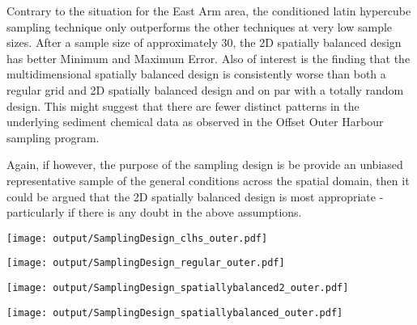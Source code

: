 \documentclass[a4paper]{article}
\let\origfigure=\figure
\let\endorigfigure=\endfigure
\renewenvironment{figure}[1][]{%
   \origfigure[H]
}{%
   \endorigfigure
}
\begin{document}
Contrary to the situation for the East Arm area, the conditioned latin
hypercube sampling technique only outperforms the other techniques at
very low sample sizes. After a sample size of approximately 30, the 2D
spatially balanced design has better Minimum and Maximum Error. Also of
interest is the finding that the multidimensional spatially balanced
design is consistently worse than both a regular grid and 2D spatially
balanced design and on par with a totally random design. This might
suggest that there are fewer distinct patterns in the underlying
sediment chemical data as observed in the Offset Outer Harbour sampling
program.

Again, if however, the purpose of the sampling design is be provide an
unbiased representative sample of the general conditions across the
spatial domain, then it could be argued that the 2D spatially balanced
design is most appropriate - particularly if there is any doubt in the
above assumptions.

\begin{figure}
\centering\scriptsize
\texttt{[image: output/SamplingDesign\_clhs\_outer.pdf]}
\caption{Sampling configurations associated with the lowest mean Error
for each sample size for cLHS for the Outer
Harbour\label{fig:SamplingDesign_clhs_outer}}
\end{figure}

\begin{figure}
\centering\scriptsize
\texttt{[image: output/SamplingDesign\_regular\_outer.pdf]}
\caption{Sampling configurations associated with the lowest mean Error
for each sample size for Regular grid sampling for the Outer
Harbour\label{fig:SamplingDesign_regular_outer}}
\end{figure}

\begin{figure}
\centering\scriptsize
\texttt{[image: output/SamplingDesign\_spatiallybalanced2\_outer.pdf]}
\caption{Sampling configurations associated with the lowest mean Error
for each sample size for nD Spatially balanced sampling for the Outer
Harbour\label{fig:SamplingDesign_spatiallybalanced2_outer}}
\end{figure}

\begin{figure}
\centering\scriptsize
\texttt{[image: output/SamplingDesign\_spatiallybalanced\_outer.pdf]}
\caption{Sampling configurations associated with the lowest mean Error
for each sample size for 2D Spatially balanced sampling for the Outer
Harbour\label{fig:SamplingDesign_spatiallybalanced_outer}}
\end{figure}
\end{document}
